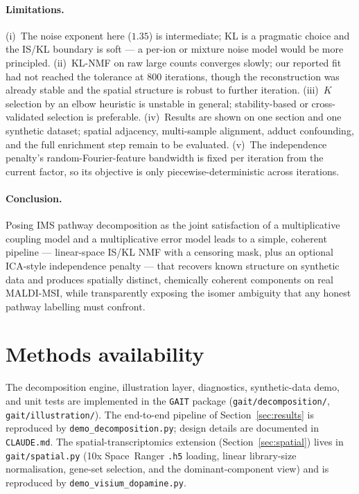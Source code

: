 \documentclass[11pt]{article}
\newcommand{\code}[1]{\texttt{#1}}
\begin{document}
\paragraph{Limitations.} (i)~The noise exponent here ($1.35$) is intermediate; KL is a
pragmatic choice and the IS/KL boundary is soft --- a per-ion or mixture noise model would be
more principled. (ii)~KL-NMF on raw large counts converges slowly; our reported fit had not
reached the tolerance at $800$ iterations, though the reconstruction was already stable and
the spatial structure is robust to further iteration. (iii)~$K$ selection by an elbow
heuristic is unstable in general; stability-based or cross-validated selection is preferable.
(iv)~Results are shown on one section and one synthetic dataset; spatial adjacency,
multi-sample alignment, adduct confounding, and the full enrichment step remain to be
evaluated. (v)~The independence penalty's random-Fourier-feature bandwidth is fixed per
iteration from the current factor, so its objective is only piecewise-deterministic across
iterations.

\paragraph{Conclusion.} Posing IMS pathway decomposition as the joint satisfaction of a
multiplicative coupling model and a multiplicative error model leads to a simple, coherent
pipeline --- linear-space IS/KL NMF with a censoring mask, plus an optional ICA-style
independence penalty --- that recovers known structure on synthetic data and produces
spatially distinct, chemically coherent components on real MALDI-MSI, while transparently
exposing the isomer ambiguity that any honest pathway labelling must confront.

\section*{Methods availability}

The decomposition engine, illustration layer, diagnostics, synthetic-data demo, and unit
tests are implemented in the \code{GAIT} package (\code{gait/decomposition/},
\code{gait/illustration/}). The end-to-end pipeline of Section~\ref{sec:results} is
reproduced by \code{demo\_decomposition.py}; design details are documented in
\code{CLAUDE.md}. The spatial-transcriptomics extension (Section~\ref{sec:spatial}) lives in
\code{gait/spatial.py} (10x Space~Ranger \code{.h5} loading, linear library-size
normalisation, gene-set selection, and the dominant-component view) and is reproduced by
\code{demo\_visium\_dopamine.py}.


\end{document}
